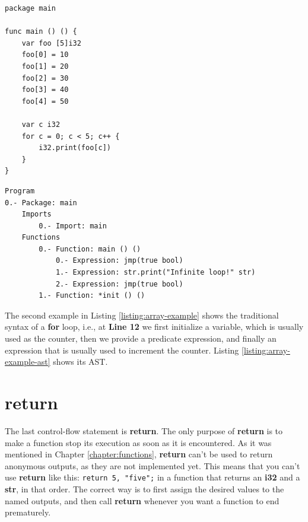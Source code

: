 \documentclass[11pt,fleqn,openany]{book} %
\begin{document}
\begin{lstlisting}[caption={Traditional Syntax of For Loop},captionpos=b,label={listing:array-example}]
package main

func main () () {
	var foo [5]i32
	foo[0] = 10
	foo[1] = 20
	foo[2] = 30
	foo[3] = 40
	foo[4] = 50

	var c i32
	for c = 0; c < 5; c++ {
		i32.print(foo[c])
	}
}
\end{lstlisting}

\begin{lstlisting}[caption={Listing \ref{listing:array-example}'s Abstract Syntax Tree},captionpos=b,label={listing:array-example-ast}]
Program
0.- Package: main
	Imports
		0.- Import: main
	Functions
		0.- Function: main () ()
			0.- Expression: jmp(true bool)
			1.- Expression: str.print("Infinite loop!" str)
			2.- Expression: jmp(true bool)
		1.- Function: *init () ()
\end{lstlisting}

The second example in Listing \ref{listing:array-example} shows the traditional syntax of a \textbf{for} loop, i.e., at \textbf{Line 12} we first initialize a variable, which is usually used as the counter, then we provide a predicate expression, and finally an expression that is usually used to increment the counter. Listing \ref{listing:array-example-ast} shows its AST.

\section{return}


The last control-flow statement is \textbf{return}. The only purpose of \textbf{return} is to make a function stop its execution as soon as it is encountered. As it was mentioned in Chapter \ref{chapter:functions}, \textbf{return} can't be used to return anonymous outputs, as they are not implemented yet. This means that you can't use \textbf{return} like this: \lstinline{return 5, "five";} in a function that returns an \textbf{i32} and a \textbf{str}, in that order. The correct way is to first assign the desired values to the named outputs, and then call \textbf{return} whenever you want a function to end prematurely.
\end{document}
